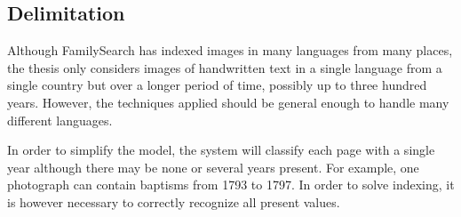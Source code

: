 \subsection{Delimitation}

Although FamilySearch has indexed images in many languages from many places,
the thesis only considers images of handwritten text in a single language from a single country but over a longer period of time, possibly up to three hundred years.
However, the techniques applied should be general enough to handle many different languages.


In order to simplify the model,
the system will classify each page with a single year although there may be none or several years present. For example, one photograph can contain baptisms from 1793 to 1797. In order to solve indexing, it is however necessary to correctly recognize all present values.

